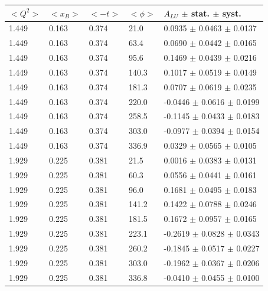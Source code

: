 \begin{table}[!h]
   \begin{center}
      \begin{tabular}{||l|l|l|l|l||}
         \hline
 $<Q^{2}>$ & $<x_{B}>$ & $<-t>$ & $<\phi>$ & $A_{LU}$ $\pm$ stat. $\pm$ syst.\\
         \hline
 1.449 & 0.163 & 0.374 &  21.0  &  0.0935 $\pm$ 0.0463  $\pm$  0.0137 \\ 
  1.449 & 0.163 & 0.374 &  63.4  &  0.0690 $\pm$ 0.0442  $\pm$  0.0165 \\ 
  1.449 & 0.163 & 0.374 &  95.6  &  0.1469 $\pm$ 0.0439  $\pm$  0.0216 \\ 
  1.449 & 0.163 & 0.374 & 140.3  &  0.1017 $\pm$ 0.0519  $\pm$  0.0149 \\ 
  1.449 & 0.163 & 0.374 & 181.3  &  0.0707 $\pm$ 0.0619  $\pm$  0.0235 \\ 
  1.449 & 0.163 & 0.374 & 220.0  & -0.0446 $\pm$ 0.0616  $\pm$  0.0199 \\ 
  1.449 & 0.163 & 0.374 & 258.5  & -0.1145 $\pm$ 0.0433  $\pm$  0.0183 \\ 
  1.449 & 0.163 & 0.374 & 303.0  & -0.0977 $\pm$ 0.0394  $\pm$  0.0154 \\ 
  1.449 & 0.163 & 0.374 & 336.9  &  0.0329 $\pm$ 0.0565  $\pm$  0.0105 \\ 
  \hline                                                              
                                                                         
  1.929 & 0.225 & 0.381 &  21.5  &  0.0016 $\pm$ 0.0383  $\pm$  0.0131 \\
  1.929 & 0.225 & 0.381 &  60.3  &  0.0556 $\pm$ 0.0441  $\pm$  0.0161 \\
  1.929 & 0.225 & 0.381 &  96.0  &  0.1681 $\pm$ 0.0495  $\pm$  0.0183 \\
  1.929 & 0.225 & 0.381 & 141.2  &  0.1422 $\pm$ 0.0788  $\pm$  0.0246 \\
  1.929 & 0.225 & 0.381 & 181.5  &  0.1672 $\pm$ 0.0957  $\pm$  0.0165 \\
  1.929 & 0.225 & 0.381 & 223.1  & -0.2619 $\pm$ 0.0828  $\pm$  0.0343 \\
  1.929 & 0.225 & 0.381 & 260.2  & -0.1845 $\pm$ 0.0517  $\pm$  0.0227 \\
  1.929 & 0.225 & 0.381 & 303.0  & -0.1962 $\pm$ 0.0367  $\pm$  0.0206 \\
  1.929 & 0.225 & 0.381 & 336.8  & -0.0410 $\pm$ 0.0455  $\pm$  0.0100 \\
  \hline                                                              
                                                                         

\end{tabular}
\end{center}
\end{table}
